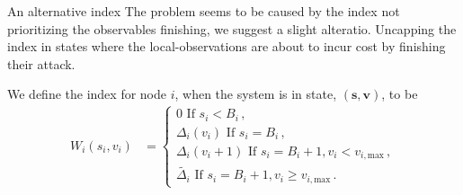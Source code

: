 \documentclass[10pt]{beamer}
\begin{document}
\begin{frame}{An alternative index}
The problem seems to be caused by the index not prioritizing the observables finishing, we suggest a slight alteratio. Uncapping the index in states where the local-observations are about to incur cost by finishing their attack.
\begin{definition}
We define the index for node $i$, when the system is in state, $(\bm{s},\bm{v})$, to be
\begin{align*}
W_{i}(s_{i},v_{i})&=\begin{cases}
0 \text{ If } s_{i}<B_{i} \, , \\
\Delta_{i}(v_{i}) \text{ If } s_{i}=B_{i} \, , \\
\Delta_{i}(v_{i}+1) \text{ If } s_{i}=B_{i}+1, v_{i} < v_{i,\text{max}} \, , \\
\widetilde{\Delta_{i}} \text{ If } s_{i}=B_{i}+1, v_{i} \geq v_{i,\text{max}} \, .
\end{cases}
\end{align*}
\end{definition}
\end{frame}
\end{document}
